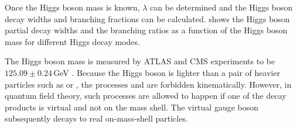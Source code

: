 Once the Higgs boson mass is known, $\lambda$ can be determined and the Higgs boson decay widths and branching fractions can be calculated.  shows the Higgs boson partial decay widths and the branching ratios as a function of the Higgs boson mass for different Higgs decay modes.






The Higgs boson mass is measured by ATLAS and CMS experiments to be $125.09\pm0.24$\,GeV \cite{Agashe:2014kda}. Because the Higgs boson is lighter than a pair of heavier particles such as \HepProcess{\PWp\PWm} or \HepProcess{\PZ\PZ}, the processes \HepProcess{\PH \to \PWp\PWm} and \HepProcess{\PH \to \PZ\PZ} are forbidden kinematically. However,  in quantum field theory,  such processes are allowed to happen if one of the decay products is virtual and not on the mass shell. The virtual gauge boson subsequently decays to real on-mass-shell particles.


